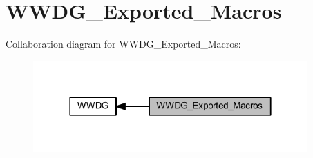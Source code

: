 \hypertarget{group___w_w_d_g___exported___macros}{}\section{W\+W\+D\+G\+\_\+\+Exported\+\_\+\+Macros}
\label{group___w_w_d_g___exported___macros}
Collaboration diagram for W\+W\+D\+G\+\_\+\+Exported\+\_\+\+Macros\+:
\nopagebreak
\begin{figure}[H]
\begin{center}
\leavevmode
\includegraphics[width=298pt]{group___w_w_d_g___exported___macros}
\end{center}
\end{figure}
